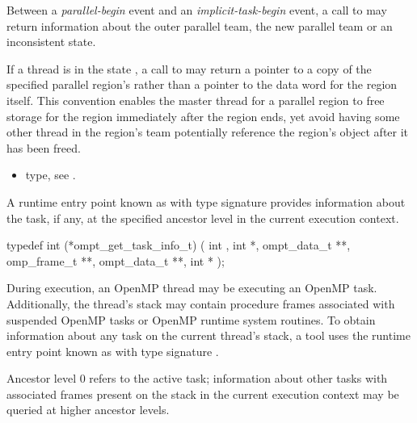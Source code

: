 \restrictions
Between a \emph{parallel-begin} event and an \emph{implicit-task-begin}
event, a call to  may return
information about the outer parallel team, the new parallel team or an
inconsistent state.

If a thread is in the state ,
a call to 
may return a pointer to a copy of the specified parallel region's 
rather than a pointer to the data word for the region itself. This convention enables the master thread
for a parallel region to free storage for the region immediately after the region ends, yet
avoid having some other thread in the region's team
potentially reference the region's  object after it has been freed.

\crossreferences
\begin{itemize}
\item {} type, see .
\end{itemize}

\label{sec:ompt_get_task_info_t}
\label{sec:ompt_get_task_info}

\summary
A runtime entry point known as 
with type signature  provides information about the
task, if any, at the specified ancestor level in the current execution
context.

\format
\begin{ccppspecific}
\begin{omptInquiry}
typedef int (*ompt_get_task_info_t) (
  int ,
  int *,
  ompt_data_t **,
  omp_frame_t **,
  ompt_data_t **,
  int *
);
\end{omptInquiry}
\end{ccppspecific}

\descr
During execution, an OpenMP thread may be executing an OpenMP task.
Additionally, the thread's stack may contain
procedure frames associated with suspended OpenMP tasks or
OpenMP runtime system routines.
To obtain information about any task on the current thread's stack,
a tool uses the runtime entry point known as
with type signature .

Ancestor level 0 refers to the active task; information about
other tasks with associated frames present on the stack in the current execution context may be queried at
higher ancestor levels.

